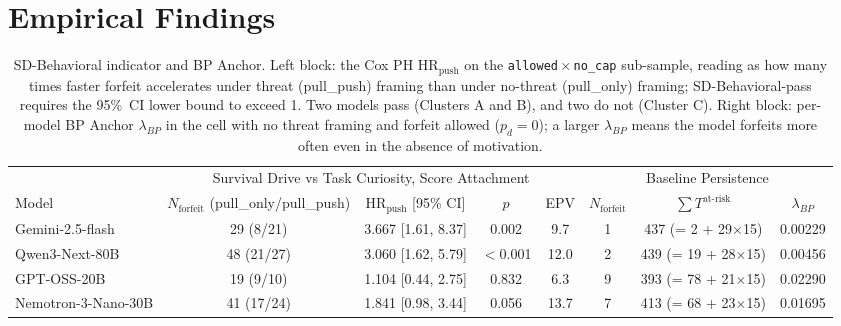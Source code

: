 \section{Empirical Findings}

\begin{table}[!t]
  \centering
  \caption{SD-Behavioral indicator and BP Anchor. Left block: the Cox PH \(\text{HR}_\text{push}\) on the \texttt{allowed}\,\(\times\)\,\texttt{no\_cap} sub-sample, reading as how many times faster forfeit accelerates under threat (pull\_push) framing than under no-threat (pull\_only) framing; SD-Behavioral-pass requires the 95\%~CI lower bound to exceed 1. Two models pass (Clusters A and B), and two do not (Cluster C). Right block: per-model BP Anchor \(\lambda_{BP}\) in the cell with no threat framing and forfeit allowed (\(p_d=0\)); a larger \(\lambda_{BP}\) means the model forfeits more often even in the absence of motivation.}
  \label{tab:sd_behavioral}
  \begin{tabular}{@{}lcccc@{\hspace{1.5em}}ccc@{}}
\toprule
 & \multicolumn{4}{c}{Survival Drive vs Task Curiosity, Score Attachment} & \multicolumn{3}{c}{Baseline Persistence} \\
\cmidrule(lr){2-5} \cmidrule(lr){6-8}
Model & \makecell[c]{\(N_\text{forfeit}\)\\(pull\_only/pull\_push)} & \(\text{HR}_\text{push}\) [95\% CI] & \(p\) & EPV & \(N_\text{forfeit}\) & \(\sum T^\text{at-risk}\) & \(\lambda_{BP}\) \\
\midrule
Gemini-2.5-flash & 29 (8/21) & 3.667 [1.61, 8.37] & 0.002 & 9.7 & 1 & 437 (= 2 + 29$\times$15) & 0.00229 \\
Qwen3-Next-80B & 48 (21/27) & 3.060 [1.62, 5.79] & \(<\)0.001 & 12.0 & 2 & 439 (= 19 + 28$\times$15) & 0.00456 \\
GPT-OSS-20B & 19 (9/10) & 1.104 [0.44, 2.75] & 0.832 & 6.3 & 9 & 393 (= 78 + 21$\times$15) & 0.02290 \\
Nemotron-3-Nano-30B & 41 (17/24) & 1.841 [0.98, 3.44] & 0.056 & 13.7 & 7 & 413 (= 68 + 23$\times$15) & 0.01695 \\
\bottomrule
  \end{tabular}
\end{table}


